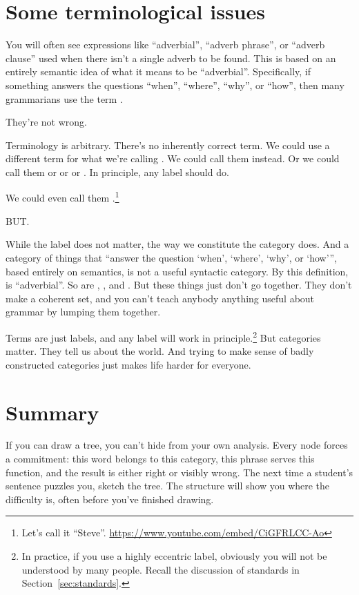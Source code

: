 \section{Some terminological issues} \label{sec:terminology}

You will often see expressions like \enquote{adverbial}, \enquote{adverb phrase}, or \enquote{adverb clause} used when there isn't a single adverb to be found. This is based on an entirely semantic idea of what it means to be \enquote{adverbial}. Specifically, if something answers the questions \enquote{when}, \enquote{where}, \enquote{why}, or \enquote{how}, then many grammarians use the term .

They're not wrong.

Terminology is arbitrary. There's no inherently correct term. We could use a different term for what we're calling . We could call them  instead. Or we could call them  or  or  or . In principle, any label should do.

We could even call them .\footnote{Let's call it ``Steve''. \url{https://www.youtube.com/embed/CiGFRLCC-Ao}}

BUT.

While the label does not matter, the way we constitute the category does. And a category of things that \enquote{answer the question \enquote{when}, \enquote{where}, \enquote{why}, or \enquote{how}}, based entirely on semantics, is not a useful syntactic category. By this definition,  is \enquote{adverbial}. So are , , and . But these things just don't go together. They don't make a coherent set, and you can't teach anybody anything useful about grammar by lumping them together.

Terms are just labels, and any label will work in principle.\footnote{In practice, if you use a highly eccentric label, obviously you will not be understood by many people. Recall the discussion of standards in Section~\ref{sec:standards}.} But categories matter. They tell us about the world. And trying to make sense of badly constructed categories just makes life harder for everyone.

\section{Summary}

If you can draw a tree, you can't hide from your own analysis. Every node forces a commitment: this word belongs to this category, this phrase serves this function, and the result is either right or visibly wrong. The next time a student's sentence puzzles you, sketch the tree. The structure will show you where the difficulty is, often before you've finished drawing.
